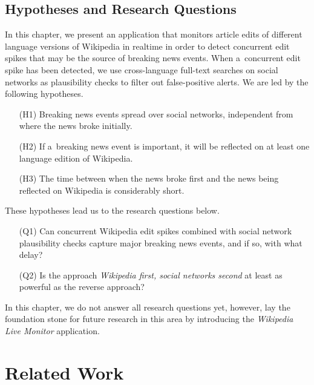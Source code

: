 \subsection{Hypotheses and Research Questions}
\label{sec:hypotheses-and-research-questions}

In this chapter, we present an application that monitors article edits
of different language versions of Wikipedia in realtime
in order to detect concurrent edit spikes that may be the source of
breaking news events.
When a~concurrent edit spike has been detected,
we use cross-language full-text searches on social networks
as plausibility checks to filter out false-positive alerts.
We are led by the following hypotheses.

\begin{itemize}
  \itemsep0em
  \item[(H1)] Breaking news events spread over social networks,
    independent from where the news broke initially.
  \item[(H2)] If a~breaking news event is important, it will be reflected on
    at least one language edition of Wikipedia.
  \item[(H3)] The time between when the news broke first and the news
    being reflected on Wikipedia is considerably short.   
\end{itemize}

\noindent These hypotheses lead us to the research questions below.

\begin{itemize}
  \itemsep0em
  \item[(Q1)] Can concurrent Wikipedia edit spikes combined with
    social network plausibility checks capture major breaking news events,
    and if so, with what delay?
  \item[(Q2)] Is the approach \emph{Wikipedia first, social networks second}
    at least as powerful as the reverse approach?
\end{itemize}

In this chapter, we do not answer all research questions yet,
however, lay the foundation stone for future research in this area
by introducing the \emph{Wikipedia Live Monitor} application.

\section{Related Work}

